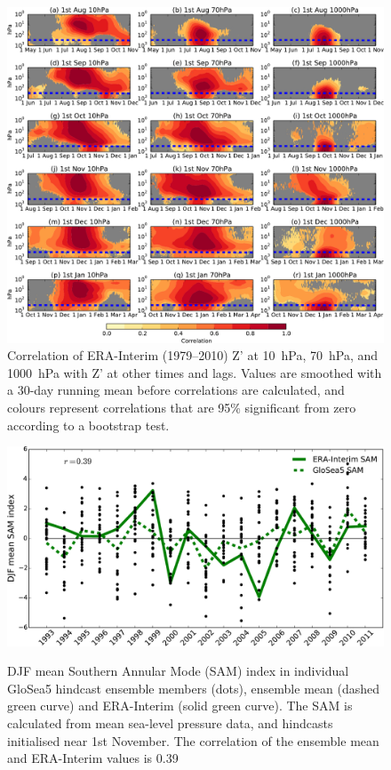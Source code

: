  \begin{figure}[p] \vspace*{-3cm} \centering
 \noindent\includegraphics[width=\textwidth]{figures/chapter-seasonal/lag_height_corr_obs.pdf}
 \caption[Lag-height correlation of $Z'$ at 10~hPa and 1000~hPa.]{Correlation of
   ERA-Interim (1979--2010) Z' at 10~hPa, 70~hPa, and 1000~hPa with Z' at other
   times and lags. Values are smoothed with a 30-day running mean before
   correlations are calculated, and colours represent correlations that are 95\%
   significant from zero according to a bootstrap test.}
 \label{fig:lag_height_corr_obs}
 \end{figure}

\begin{figure}[t]
  \noindent\includegraphics[width=\textwidth,angle=0]{figures/chapter-seasonal/DJF_SAM.pdf}\\
  \caption[GloSea5 predictions of the SAM.]{DJF mean Southern Annular Mode (SAM)
    index in individual GloSea5 hindcast ensemble members (dots), ensemble mean
    (dashed green curve) and ERA-Interim (solid green curve). The SAM is
    calculated from mean sea-level pressure data, and hindcasts initialised near
    1st November. The correlation of the ensemble mean and ERA-Interim values is
    0.39}\label{fig:djf_sam_ts}
\end{figure}

